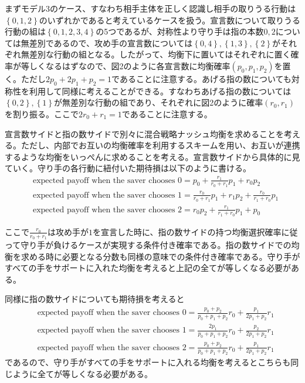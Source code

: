 \documentclass{jsarticle}
\begin{document}
まずモデル3のケース、すなわち相手主体を正しく認識し相手の取りうる行動は$\left\{0,1,2\right\}$のいずれかであると考えているケースを扱う。宣言数について取りうる行動の組は$\left\{ 0,1,2,3,4\right\}$の5つであるが、対称性より守り手は指の本数$0,2$については無差別であるので、攻め手の宣言数については$\left\{ 0,4 \right\},\left\{ 1,3 \right\},\left\{ 2\right\} $がそれぞれ無差別な行動の組となる。したがって、均衡下に置いてはそれぞれに置く確率が等しくなるはずなので、図2のように各宣言数に均衡確率$(p_0, p_1, p_2)$を置く。ただし$2p_0 + 2p_1 + p_2 = 1$であることに注意する。あげる指の数についても対称性を利用して同様に考えることができる。すなわちあげる指の数については$\left\{ 0,2 \right\}, \left\{ 1 \right\}$が無差別な行動の組であり、それぞれに図2のように確率$(r_0, r_1)$を割り振る。ここで$2r_0 + r_1 = 1$であることに注意する。

宣言数サイドと指の数サイドで別々に混合戦略ナッシュ均衡を求めることを考える。ただし、内部でお互いの均衡確率を利用するスキームを用い、お互いが連携するような均衡をいっぺんに求めることを考える。宣言数サイドから具体的に見ていく。守り手の各行動に紐付いた期待損は以下のように書ける。
\begin{align*}
	&\text{expected payoff when the saver chooses 0} = p_0 + \frac{r_1}{r_0 + r_1}p_1 + r_0p_2\\
	&\text{expected payoff when the saver chooses 1} = \frac{r_0}{r_0 + r_1}p_1 + r_1p_2 + \frac{r_0}{r_1 + r_0}p_1\\
	&\text{expected payoff when the saver chooses 2} = r_0p_2 + \frac{r_1}{r_1  + r_0}p_1 + p_0
\end{align*}

ここで$\frac{r_0}{r_0+r_1}$は攻め手が$1$を宣言した時に、指の数サイドの持つ均衡選択確率に従って守り手が負けるケースが実現する条件付き確率である。指の数サイドでの均衡を求める時に必要となる分数も同様の意味での条件付き確率である。守り手がすべての手をサポートに入れた均衡を考えると上記の全てが等しくなる必要がある。

同様に指の数サイドについても期待損を考えると
\begin{align*}
	&\text{expected payoff when the saver chooses 0} = \frac{p_0 + p_2}{p_0 + p_1 + p_2}r_0 + \frac{p_1}{2p_1 + p_2}r_1\\[8pt]
	&\text{expected payoff when the saver chooses 1} = \frac{2p_1}{p_0 + p_1 + p_2}r_0 + \frac{p_2}{2p_1 + p_2}r_1\\[8pt]
	&\text{expected payoff when the saver chooses 2} = \frac{p_0 + p_2}{p_0 + p_1 + p_2}r_0 + \frac{p_1}{2p_1 + p_2}r_1
\end{align*}
であるので、守り手がすべての手をサポートに入れる均衡を考えるとこちらも同じように全てが等しくなる必要がある。
\end{document}
